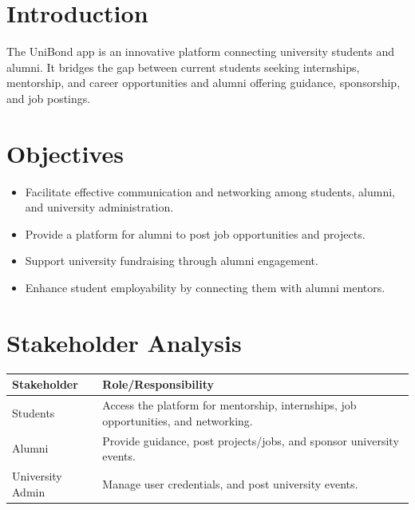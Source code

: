 \documentclass[a4paper,12pt]{article}
\begin{document}
\section{Introduction}
The UniBond app is an innovative platform connecting university students and alumni. It bridges the gap between current students seeking internships, mentorship, and career opportunities and alumni offering guidance, sponsorship, and job postings.

\section{Objectives}
\begin{itemize}
    \item Facilitate effective communication and networking among students, alumni, and university administration.
    \item Provide a platform for alumni to post job opportunities and projects.
    \item Support university fundraising through alumni engagement.
    \item Enhance student employability by connecting them with alumni mentors.
\end{itemize}

\section{Stakeholder Analysis}
\begin{longtable}{|l|p{12cm}|}
\hline
\textbf{Stakeholder} & \textbf{Role/Responsibility} \\ \hline
Students & Access the platform for mentorship, internships, job opportunities, and networking. \\ \hline
Alumni & Provide guidance, post projects/jobs, and sponsor university events. \\ \hline
University Admin & Manage user credentials, and post university events. \\ \hline
\end{longtable}
\end{document}
